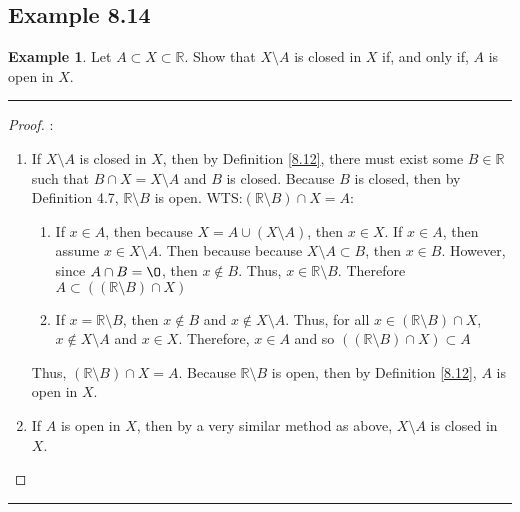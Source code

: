 \documentclass[openany, amssymb, psamsfonts]{amsart}
\newcommand{\bbR}{\mathbb{R}}
\renewcommand{\emptyset}{\O}
\newcommand{\sm}{\setminus}
\theoremstyle{definition}
\newtheorem{exmp}{Example}[section]
\numberwithin{equation}{section}
\begin{document}
\subsection*{Example 8.14}
\begin{exmp} \label{8.14} Let $A\subset X\subset \bbR$. Show that $X\setminus A$ is closed in $X$ if, and only if, $A$ is open in $X$.
\end{exmp}
\vspace{4pt}     \hrule   \vspace{4pt} \begin {proof}:\\
\begin{enumerate}
    \item If $X\sm A$ is closed in $X$, then by Definition \ref{8.12}, there must exist some $B\in \bbR$ such that $B \cap X = X\sm A$ and $B$ is closed. Because $B$ is closed, then by Definition 4.7, $\bbR\sm B$ is open. WTS:$(\bbR \sm B) \cap X = A$:
    \begin{enumerate}
        \item If $x\in A$, then because $X = A \cup (X\sm A)$, then $x\in X$. If $x\in A$, then assume $x\in X\sm A$. Then because because $X\sm A \subset B$, then $x\in B$. However, since $A \cap B = \emptyset$, then $x\notin B$. Thus, $x\in \bbR\sm B$. Therefore $A \subset ((\bbR \sm B)\cap X)$
        \item If $x= \bbR \sm B$, then $x\notin B$ and $x\notin X\sm A$. Thus, for all $x\in (\bbR \sm B) \cap X$, $x\notin X\sm A$ and $x\in X$. Therefore, $x\in A$ and so $((\bbR \sm B)\cap X) \subset A$
    \end{enumerate}
Thus, $(\bbR \sm B) \cap X = A$. Because $\bbR \sm B$ is open, then by Definition \ref{8.12}, $A$ is open in $X$.
    \item If $A$ is open in $X$, then by a very similar method as above, $X\sm A$ is closed in $X$.
\end{enumerate}

\end{proof}\vspace{4pt}     \hrule   \vspace{4pt} 
\end{document}
